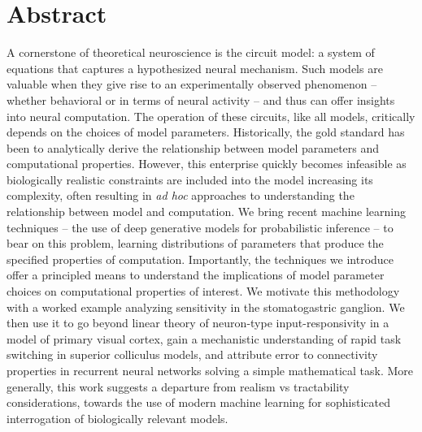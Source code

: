 \documentclass[11pt]{article}
\begin{document}
\section{Abstract}
A cornerstone of theoretical neuroscience is the circuit model: a system of equations that captures a hypothesized neural mechanism.  
Such models are valuable when they give rise to an experimentally observed phenomenon -- whether behavioral or in terms of neural activity -- and thus can offer insights into neural computation.
The operation of these circuits, like all models, critically depends on the choices of model parameters.
Historically, the gold standard has been to analytically derive the relationship between model parameters and computational properties.  
However, this enterprise quickly becomes infeasible as biologically realistic constraints are included into the model increasing its complexity, often resulting in \emph{ad hoc} approaches to understanding the relationship between model and computation.  
We bring recent machine learning techniques -- the use of deep generative models for probabilistic inference -- to bear on this problem, learning distributions of parameters that produce the specified properties of computation.   
Importantly, the techniques we introduce offer a principled means to understand the implications of model parameter choices on computational properties of interest.  
We motivate this methodology with a worked example analyzing sensitivity in the stomatogastric ganglion.  
We then use it to go beyond linear theory of neuron-type input-responsivity in a model of primary visual cortex, gain a mechanistic understanding of rapid task switching in superior colliculus models, and attribute error to connectivity properties in recurrent neural networks solving a simple mathematical task. 
More generally, this work suggests a departure from realism vs tractability considerations, towards the use of modern machine learning for sophisticated interrogation of biologically relevant models.
\end{document}
